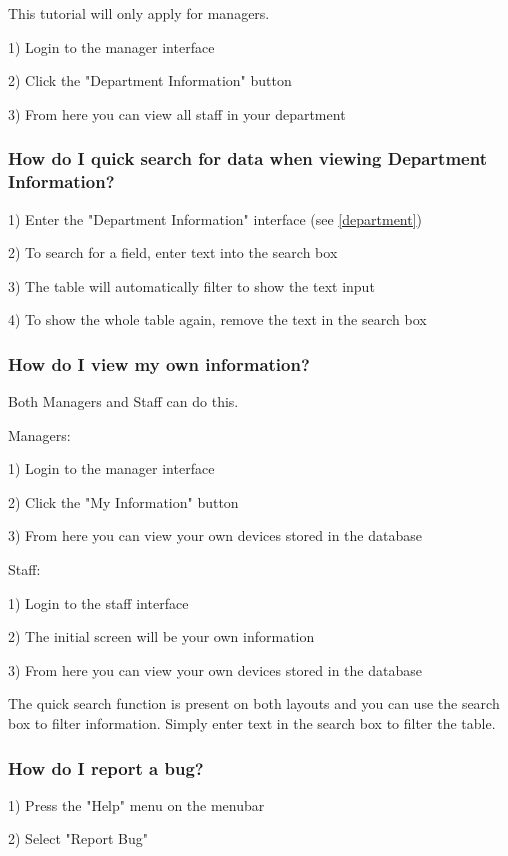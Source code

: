This tutorial will only apply for managers.

1) Login to the manager interface

2) Click the "Department Information" button

3) From here you can view all staff in your department

\subsubsection{How do I quick search for data when viewing Department Information?}

1) Enter the "Department Information" interface (see \ref{department})

2) To search for a field, enter text into the search box 

3) The table will automatically filter to show the text input

4) To show the whole table again, remove the text in the search box

\subsubsection{How do I view my own information?}

Both Managers and Staff can do this.

Managers:

1) Login to the manager interface

2) Click the "My Information" button 

3) From here you can view your own devices stored in the database

Staff:

1) Login to the staff interface

2) The initial screen will be your own information

3) From here you can view your own devices stored in the database

The quick search function is present on both layouts and you can use the search box to filter information. Simply enter text in the search box to filter the table.

\subsubsection{How do I report a bug?}

1) Press the "Help" menu on the menubar

2) Select "Report Bug"

